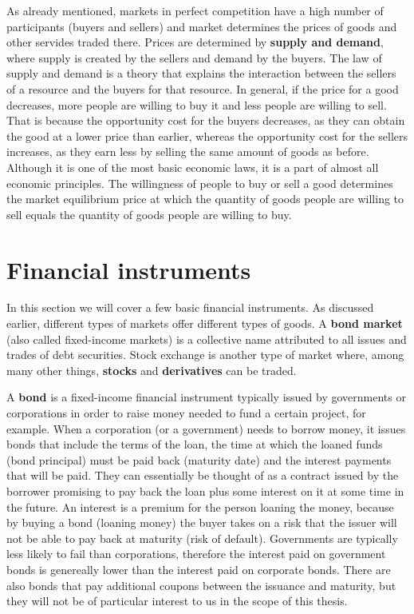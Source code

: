 \documentclass[times, utf8, diplomski]{fer}
\begin{document}
As already mentioned, markets in perfect competition have a high number of participants (buyers and sellers) and market determines the prices of goods and other servides traded there. Prices are determined by \textbf{supply and demand}, where supply is created by the sellers and demand by the buyers. The law of supply and demand is a theory that explains the interaction between the sellers of a resource and the buyers for that resource. In general, if the price for a good decreases, more people are willing to buy it and less people are willing to sell. That is because the opportunity cost for the buyers decreases, as they can obtain the good at a lower price than earlier, whereas the opportunity cost for the sellers increases, as they earn less by selling the same amount of goods as before. Although it is one of the most basic economic laws, it is a part of almost all economic principles. The willingness of people to buy or sell a good determines the market equilibrium price at which the quantity of goods people are willing to sell equals the quantity of goods people are willing to buy. 

\section{Financial instruments}
In this section we will cover a few basic financial instruments. As discussed earlier, different types of markets offer different types of goods. A \textbf{bond market} (also called fixed-income markets) is a collective name attributed to all issues and trades of debt securities. Stock exchange is another type of market where, among many other things, \textbf{stocks} and \textbf{derivatives} can be traded. 

\hfill \break
A \textbf{bond} is a fixed-income financial instrument typically issued by governments or corporations in order to raise money needed to fund a certain project, for example. When a corporation (or a government) needs to borrow money, it issues bonds that include the terms of the loan, the time at which the loaned funds (bond principal) must be paid back (maturity date) and the interest payments that will be paid. They can essentially be thought of as a contract issued by the borrower promising to pay back the loan plus some interest on it at some time in the future. An interest is a premium for the person loaning the money, because by buying a bond (loaning money) the buyer takes on a risk that the issuer will not be able to pay back at maturity (risk of default). Governments are typically less likely to fail than corporations, therefore the interest paid on government bonds is genereally lower than the interest paid on corporate bonds. There are also bonds that pay additional coupons between the issuance and maturity, but they will not be of particular interest to us in the scope of this thesis.
\end{document}

